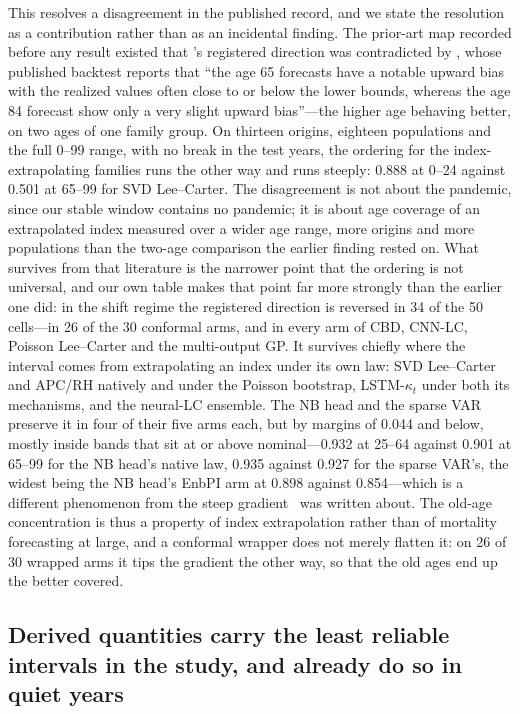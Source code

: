 This resolves a disagreement in the published record, and we state the
resolution as a contribution rather than as an incidental finding. The
prior-art map recorded before any result existed that \Hfour's registered
direction was contradicted by \citet{dowd2010backtesting}, whose
published backtest reports that ``the age 65 forecasts have a notable
upward bias with the realized values often close to or below the lower
bounds, whereas the age 84 forecast show only a very slight upward
bias''---the higher age behaving better, on two ages of one family group.
On thirteen origins, eighteen populations and the full 0--99 range, with
no break in the test years, the ordering for the index-extrapolating
families runs the other way and runs steeply: 0.888 at 0--24 against
0.501 at 65--99 for SVD Lee--Carter. The disagreement is not about the
pandemic, since our stable window contains no pandemic; it is about age
coverage of an extrapolated index measured over a wider age range, more
origins and more populations than the two-age comparison the earlier
finding rested on. What survives from that literature is the narrower
point that the ordering is not universal, and our own table makes that
point far more strongly than the earlier one did: in the shift regime the
registered direction is reversed in 34 of the 50 cells---in 26 of the 30
conformal arms, and in every arm of CBD, CNN-LC, Poisson Lee--Carter and
the multi-output GP. It survives chiefly where the interval comes from
extrapolating an index under its own law: SVD Lee--Carter and APC/RH
natively and under the Poisson bootstrap, LSTM-$\kappa_t$ under both its
mechanisms, and the neural-LC ensemble. The NB head and the sparse VAR
preserve it in four of their five arms each, but by margins of 0.044 and
below, mostly inside bands that sit at or above nominal---0.932 at 25--64
against 0.901 at 65--99 for the NB head's native law, 0.935 against 0.927
for the sparse VAR's, the widest being the NB head's EnbPI arm at 0.898
against 0.854---which is a different phenomenon from the steep gradient
\Hfour\ was written about. The old-age concentration is thus a property
of index extrapolation rather than of mortality forecasting at large, and
a conformal wrapper does not merely flatten it: on 26 of 30 wrapped arms
it tips the gradient the other way, so that the old ages end up the
better covered.

\subsection{Derived quantities carry the least reliable intervals in the study, and already do so in quiet years}
\label{sec:discussion-derived}

